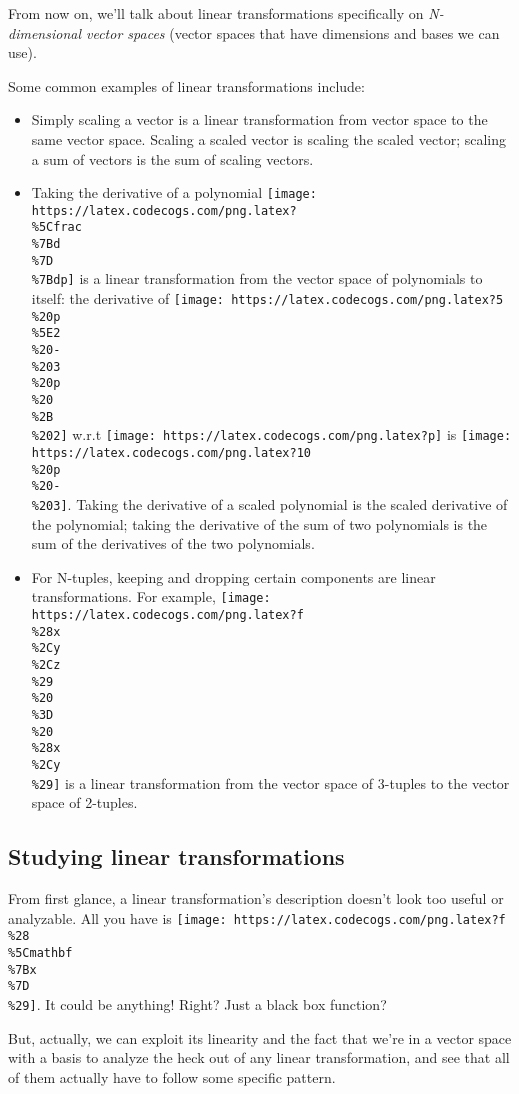 \documentclass[]{article}
\begin{document}
From now on, we'll talk about linear transformations specifically on
\emph{N-dimensional vector spaces} (vector spaces that have dimensions and bases
we can use).

Some common examples of linear transformations include:

\begin{itemize}
\tightlist
\item
  Simply scaling a vector is a linear transformation from vector space to the
  same vector space. Scaling a scaled vector is scaling the scaled vector;
  scaling a sum of vectors is the sum of scaling vectors.
\item
  Taking the derivative of a polynomial
  \texttt{[image: https://latex.codecogs.com/png.latex?\\\%5Cfrac\\\%7Bd\\\%7D\\\%7Bdp]}
  is a linear transformation from the vector space of polynomials to itself: the
  derivative of
  \texttt{[image: https://latex.codecogs.com/png.latex?5\\\%20p\\\%5E2\\\%20-\\\%203\\\%20p\\\%20\\\%2B\\\%202]}
  w.r.t \texttt{[image: https://latex.codecogs.com/png.latex?p]} is
  \texttt{[image: https://latex.codecogs.com/png.latex?10\\\%20p\\\%20-\\\%203]}.
  Taking the derivative of a scaled polynomial is the scaled derivative of the
  polynomial; taking the derivative of the sum of two polynomials is the sum of
  the derivatives of the two polynomials.
\item
  For N-tuples, keeping and dropping certain components are linear
  transformations. For example,
  \texttt{[image: https://latex.codecogs.com/png.latex?f\\\%28x\\\%2Cy\\\%2Cz\\\%29\\\%20\\\%3D\\\%20\\\%28x\\\%2Cy\\\%29]}
  is a linear transformation from the vector space of 3-tuples to the vector
  space of 2-tuples.
\end{itemize}

\hypertarget{studying-linear-transformations}{%
\subsection{Studying linear
transformations}\label{studying-linear-transformations}}

From first glance, a linear transformation's description doesn't look too useful
or analyzable. All you have is
\texttt{[image: https://latex.codecogs.com/png.latex?f\\\%28\\\%5Cmathbf\\\%7Bx\\\%7D\\\%29]}.
It could be anything! Right? Just a black box function?

But, actually, we can exploit its linearity and the fact that we're in a vector
space with a basis to analyze the heck out of any linear transformation, and see
that all of them actually have to follow some specific pattern.
\end{document}
